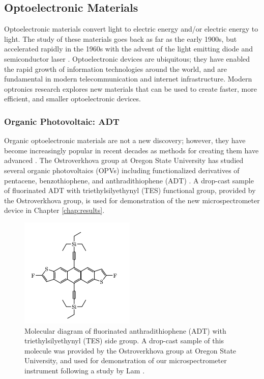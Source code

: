 \subsection{Optoelectronic Materials}\label{chap:intro-optomats}

Optoelectronic materials convert light to electric energy and/or electric energy to light. The study of these materials goes back as far as the early 1900s, but accelerated rapidly in the 1960s with the advent of the light emitting diode and semiconductor laser \cite{sweeney_optoelectronic_2017}. Optoelectronic devices are ubiquitous; they have enabled the rapid growth of information technologies around the world, and are fundamental in modern telecommunication and internet infrastructure. Modern optronics research explores new materials that can be used to create faster, more efficient, and smaller optoelectronic devices.

\subsubsection{Organic Photovoltaic: ADT}\label{chap:intro-optomats-adt}

Organic optoelectronic materials are not a new discovery; however, they have become increasingly popular in recent decades as methods for creating them have advanced \cite{ostroverkhova_organic_2016}. The Ostroverkhova group at Oregon State University has studied several organic photovoltaics (OPVs) including functionalized derivatives of pentacene, benzothiophene, and anthradithiophene (ADT) \cite{e._b._shepherd_effect_2011, platt_optical_2009}. A drop-cast sample of fluorinated ADT with triethylsilyethynyl (TES) functional group, provided by the Ostroverkhova group, is used for demonstration of the new microspectrometer device in Chapter \ref{chap:results}.

\begin{figure}[H]
    \centering
    \includegraphics{img/adt-tes-f.png}
    \caption[Molecular diagram of ADT TES-F.]{Molecular diagram of fluorinated anthradithiophene (ADT) with triethylsilyethynyl (TES) side group. A drop-cast sample of this molecule was provided by the Ostroverkhova group at Oregon State University, and used for demonstration of our microspectrometer instrument following a study by Lam \cite{lam_polarization_2018}.}
    \label{fig:adt-diagram}
\end{figure}

